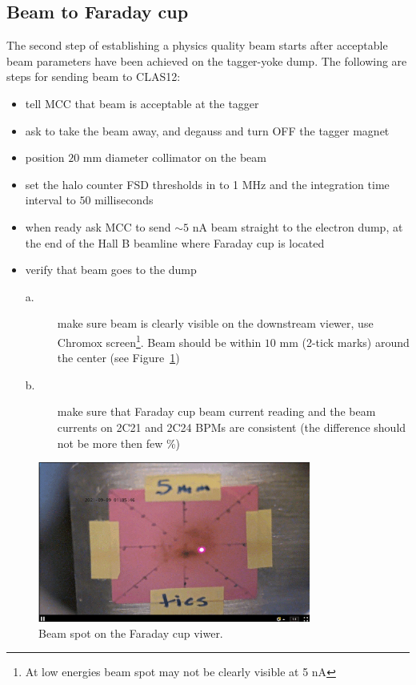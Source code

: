 \clearpage
\subsection{Beam to Faraday cup}
\indent

The second step of establishing a physics quality beam starts after acceptable beam parameters have been achieved on the tagger-yoke dump. The following are steps for sending beam to CLAS12:
\begin{itemize}
\item tell MCC that beam is acceptable at the tagger
\item ask to take the beam away, and degauss and turn OFF the tagger magnet 
\item position $20$ mm diameter collimator on the beam 
\item set the halo counter FSD thresholds in to 1 MHz and the integration time interval to $50$ milliseconds
\item when ready ask MCC to send $\sim 5$ nA beam straight to the electron dump, at the end of the Hall B beamline where Faraday cup is located 
\item verify that beam goes to the dump 
\begin{description}
\item[a.] make sure beam is clearly visible on the downstream viewer, use Chromox screen\footnote{At low energies beam spot may not be clearly visible at 5 nA}. Beam should be within $10$ mm (2-tick marks) around the center (see Figure~\ref{fig:FC_spot})
\item[b.] make sure that Faraday cup beam current reading and the beam currents on 2C21 and 2C24 BPMs are consistent (the difference  should not be more then few \%)
\end{description}
\end{itemize}

\begin{figure}[htb!]
\centering
\includegraphics[width=0.8\textwidth]{FC_viewer.pdf}
\caption{Beam spot on the Faraday cup viwer.}
\label{fig:FC_spot}
\end{figure}

